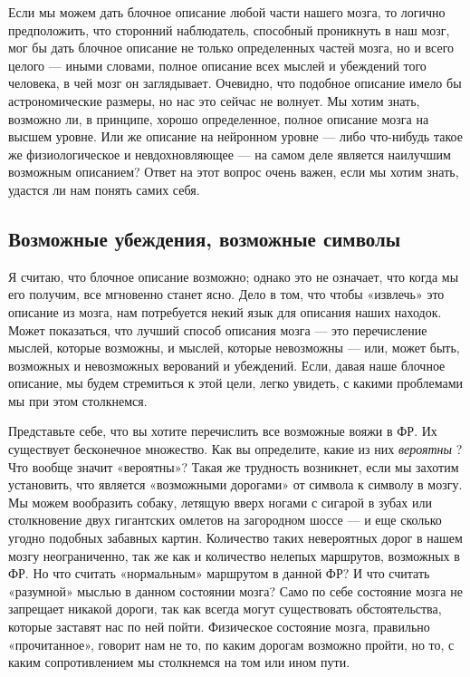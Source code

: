 \documentclass[../main.tex]{subfiles}
\begin{document}
Если мы можем дать блочное описание любой части нашего мозга, то логично предположить, что сторонний наблюдатель, способный проникнуть в наш мозг, мог бы дать блочное описание не только определенных частей мозга, но и всего целого --- иными словами, полное описание всех мыслей и убеждений того человека, в чей мозг он заглядывает. Очевидно, что подобное описание имело бы астрономические размеры, но нас это сейчас не волнует. Мы хотим знать, возможно ли, в принципе, хорошо определенное, полное описание мозга на высшем уровне. Или же описание на нейронном уровне --- либо что-нибудь такое же физиологическое и невдохновляющее --- на самом деле является наилучшим возможным описанием? Ответ на этот вопрос очень важен, если мы хотим знать, удастся ли нам понять самих себя.


\subsection{Возможные убеждения, возможные символы}

Я считаю, что блочное описание возможно; однако это не означает, что когда мы его получим, все мгновенно станет ясно. Дело в том, что чтобы «извлечь» это описание из мозга, нам потребуется некий язык для описания наших находок. Может показаться, что лучший способ описания мозга --- это перечисление мыслей, которые возможны, и мыслей, которые невозможны --- или, может быть, возможных и невозможных верований и убеждений. Если, давая наше блочное описание, мы будем стремиться к этой цели, легко увидеть, с какими проблемами мы при этом столкнемся.

Представьте себе, что вы хотите перечислить все возможные вояжи в ФР\@. Их существует бесконечное множество. Как вы определите, какие из них \emph{вероятны} ? Что вообще значит «вероятны»? Такая же трудность возникнет, если мы захотим установить, что является «возможными дорогами» от символа к символу в мозгу. Мы можем вообразить собаку, летящую вверх ногами с сигарой в зубах или столкновение двух гигантских омлетов на загородном шоссе --- и еще сколько угодно подобных забавных картин. Количество таких невероятных дорог в нашем мозгу неограниченно, так же как и количество нелепых маршрутов, возможных в ФР\@. Но что считать «нормальным» маршрутом в данной ФР? И что считать «разумной» мыслью в данном состоянии мозга? Само по себе состояние мозга не запрещает никакой дороги, так как всегда могут существовать обстоятельства, которые заставят нас по ней пойти. Физическое состояние мозга, правильно «прочитанное», говорит нам не то, по каким дорогам возможно пройти, но то, с каким сопротивлением мы столкнемся на том или ином пути.
\end{document}
